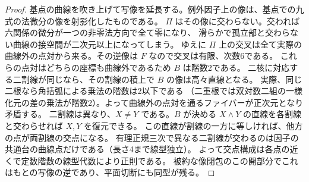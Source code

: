 \begin{proof}
基点の曲線を吹き上げて写像を延長する。例外因子上の像は、基点での九式の法微分の像を射影化したものである。
$\Pi$ はその像に交わらない。交われば六関係の微分が一つの非零法方向で全て零になり、
滑らかで孤立部と交わらない曲線の接空間が二次元以上になってしまう。
ゆえに $\Pi$ 上の交叉は全て実際の曲線外の点対から来る。その逆像は $F$ なので交叉は有限、次数6である。
これらの点対はどちらの座標も曲線外であるため $B$ は階数2である。
二核に対応する二割線が同じなら、その割線の積上で $B$ の像は高々直線となる。
実際、同じ二根なら角括弧による乗法の階数は2以下である
（二重根では双対数二組の一様化元の差の乗法が階数2）。よって曲線外の点対を通るファイバーが正次元となり矛盾する。
二割線は異なり、$X\ne Y$ である。$B$ が決める $X\wedge Y$ の直線を各割線と交わらせれば $X,Y$ を復元できる。
この直線が割線の一方に等しければ、他方の点が両割線の交点になる。
有理正規三次で異なる二割線が交わるのは因子の共通台の曲線点だけである（長さ4まで線型独立）。
よって交点構成は各点の近くで定数階数の線型代数により正則である。
被約な像閉包のこの開部分でこれはもとの写像の逆であり、平面切断にも同型が残る。
\end{proof}

